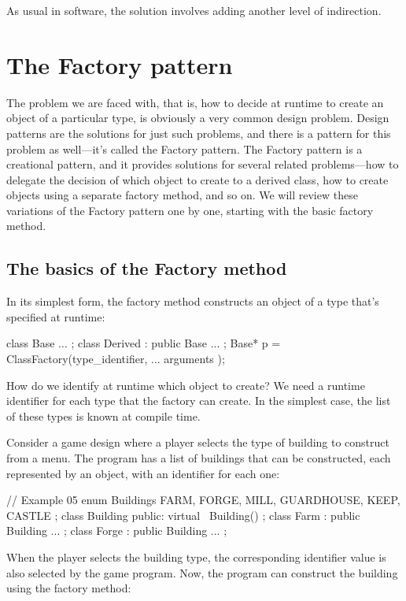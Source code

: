 As usual in software, the solution involves adding another level of indirection.

\section{The Factory pattern}

The problem we are faced with, that is, how to decide at runtime to create an object of a particular type, is obviously a very common design problem. Design patterns are the solutions for just such problems, and there is a pattern for this problem as well---it's called the Factory pattern. The Factory pattern is a creational pattern, and it provides solutions for several related problems---how to delegate the decision of which object to create to a derived class, how to create objects using a separate factory method, and so on. We will review these variations of the Factory pattern one by one, starting with the basic factory method.

\subsection{The basics of the Factory method}

In its simplest form, the factory method constructs an object of a type that's specified at runtime:

\begin{code}
class Base { ... };
class Derived : public Base { ... };
Base* p = ClassFactory(type_identifier, ... arguments );
\end{code}

How do we identify at runtime which object to create? We need a runtime identifier for each type that the factory can create. In the simplest case, the list of these types is known at compile time.

Consider a game design where a player selects the type of building to construct from a menu. The program has a list of buildings that can be constructed, each represented by an object, with an identifier for each one:

\begin{code}
// Example 05
enum Buildings {
  FARM, FORGE, MILL, GUARDHOUSE, KEEP, CASTLE
};
class Building {
  public:
  virtual ~Building() {}
};
class Farm : public Building { ... };
class Forge : public Building { ... };
\end{code}

When the player selects the building type, the corresponding identifier value is also selected by the game program. Now, the program can construct the building using the factory method:

